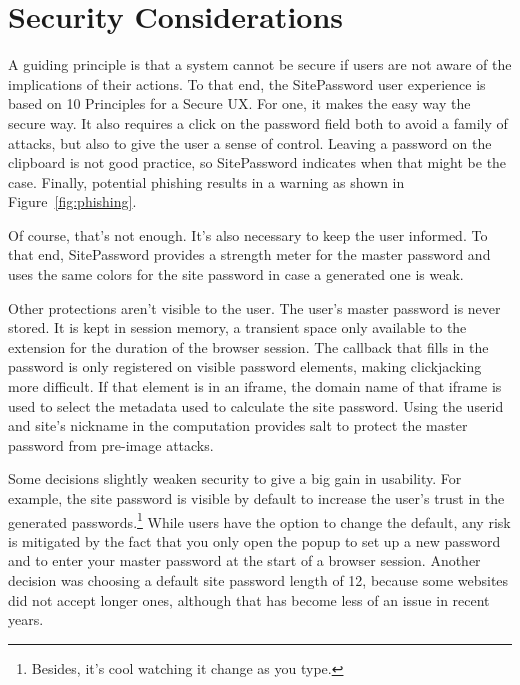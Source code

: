 \section{Security Considerations}\label{sec:security}

A guiding principle is that a system cannot be secure if users are not aware of the implications of their actions.  To that end, the SitePassword user experience is based on 10 Principles for a Secure UX.  For one, it makes the easy way the secure way.  It also requires a click on the password field both to avoid a family of attacks, but also to give the user a sense of control.  Leaving a password on the clipboard is not good practice, so SitePassword indicates when that might be the case.  Finally, potential phishing results in a warning as shown in Figure~\ref{fig:phishing}.

Of course, that's not enough.  It's also necessary to keep the user informed.  To that end, SitePassword provides a strength meter for the master password and uses the same colors for the site password in case a generated one is weak.

Other protections aren't visible to the user.  The user's master password is never stored.  It is kept in session memory, a transient space only available to the extension for the duration of the browser session.  The callback that fills in the password is only registered on visible password elements, making clickjacking more difficult.  If that element is in an iframe, the domain name of that iframe is used to select the metadata used to calculate the site password.  Using the userid and site's nickname in the computation provides salt to protect the master password from pre-image attacks.

Some decisions slightly weaken security to give a big gain in usability.  For example, the site password is visible by default to increase the user's trust in the generated passwords.\footnote{Besides, it's cool watching it change as you type.}  While users have the option to change the default, any risk is mitigated by the fact that you only open the popup to set up a new password and to enter your master password at the start of a browser session.  Another decision was choosing a default site password length of 12, because some websites did not accept longer ones, although that has become less of an issue in recent years. 

